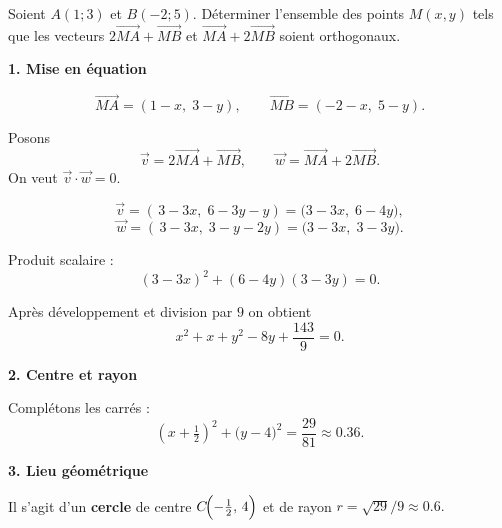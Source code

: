 \documentclass[a4paper,12pt]{article}
\begin{document}
\begin{exercice}
Soient $A(1;3)$ et $B(-2;5)$.
Déterminer l’ensemble des points $M(x,y)$ tels que
les vecteurs $2\overrightarrow{MA}+\overrightarrow{MB}$ et
$\overrightarrow{MA}+2\overrightarrow{MB}$ soient orthogonaux.
\end{exercice}

\begin{solution}[Correction]

\textbf{1. Mise en équation}

\[
\vec{MA}=(1-x,\;3-y),\qquad
\vec{MB}=(-2-x,\;5-y).
\]

Posons
\[
\vec v = 2\vec{MA}+\vec{MB},\qquad
\vec w = \vec{MA}+2\vec{MB}.
\]
On veut $\vec v\cdot\vec w=0$.

\[
\vec v = (\,3-3x,\; 6-3y- y)=\bigl(3-3x,\;6-4y\bigr),
\]
\[
\vec w = (\,3-3x,\;3- y-2y) =\bigl(3-3x,\;3-3y\bigr).
\]

Produit scalaire :
\[
(3-3x)^2 +(6-4y)(3-3y)=0.
\]

Après développement et division par $9$ on obtient
\[
x^{2}+x+y^{2}-8y+\frac{143}{9}=0.
\]

\textbf{2. Centre et rayon}

Complétons les carrés :
\[
(x+\tfrac12)^{2}+\bigl(y-4\bigr)^{2}=\frac{29}{81}\approx0.36.
\]

\textbf{3. Lieu géométrique}

Il s’agit d’un \textbf{cercle} de centre
$\displaystyle C\!\Bigl(-\tfrac12,\,4\Bigr)$
et de rayon
\(
r=\sqrt{29}/9\approx0.6.
\)
\end{solution}
\end{document}
